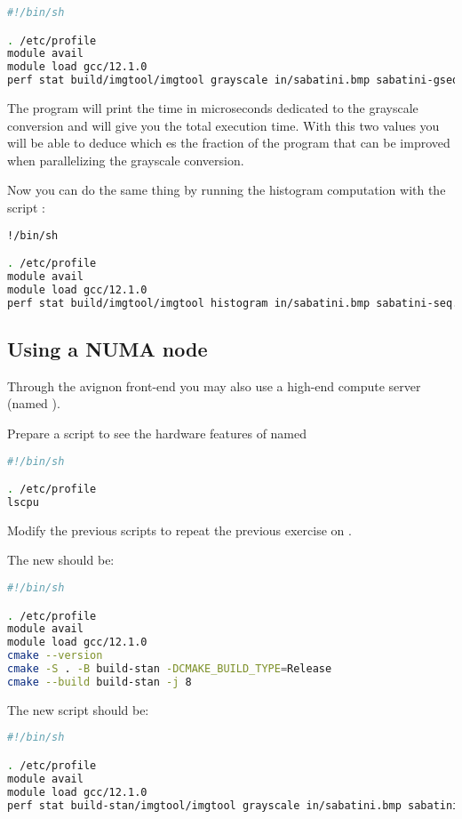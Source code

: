 \begin{lstlisting}[language=bash]
#!/bin/sh

. /etc/profile
module avail
module load gcc/12.1.0
perf stat build/imgtool/imgtool grayscale in/sabatini.bmp sabatini-gseq.bmp
\end{lstlisting}

The program will print the time in microseconds dedicated to the grayscale
conversion and  will give you the total execution time.
With this two values you will be able to deduce which es the fraction of the
program that can be improved when parallelizing the grayscale conversion.

Now you can do the same thing by running the histogram computation with the
script :

\begin{lstlisting}[language=bash]
!/bin/sh

. /etc/profile
module avail
module load gcc/12.1.0
perf stat build/imgtool/imgtool histogram in/sabatini.bmp sabatini-seq.hst
\end{lstlisting}

\subsection{Using a NUMA node}

Through the avignon front-end you may also use a high-end compute server (named
).

Prepare a script to see the hardware features of  named

\begin{lstlisting}[language=bash]
#!/bin/sh

. /etc/profile
lscpu
\end{lstlisting}

Modify the previous scripts to repeat the previous exercise on .

The new  should be:

\begin{lstlisting}[language=bash]
#!/bin/sh

. /etc/profile
module avail
module load gcc/12.1.0
cmake --version
cmake -S . -B build-stan -DCMAKE_BUILD_TYPE=Release
cmake --build build-stan -j 8
\end{lstlisting}

The new script  should be:

\begin{lstlisting}[language=bash]
#!/bin/sh

. /etc/profile
module avail
module load gcc/12.1.0
perf stat build-stan/imgtool/imgtool grayscale in/sabatini.bmp sabatini-gseq.bmp
\end{lstlisting}

